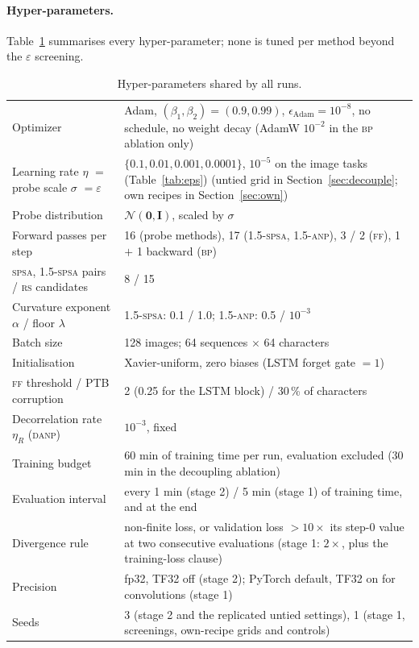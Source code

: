 \documentclass{article}
\newcommand{\method}[1]{\textsc{#1}}
\newcommand{\BP}{\method{bp}}
\newcommand{\SPSA}{\method{spsa}}
\newcommand{\SPSAb}{\method{1.5-spsa}}
\newcommand{\RS}{\method{rs}}
\newcommand{\ANPb}{\method{1.5-anp}}
\newcommand{\DANP}{\method{danp}}
\newcommand{\FF}{\method{ff}}
\newcommand{\bI}{\mathbf{I}}
\begin{document}
\paragraph{Hyper-parameters.}
Table~\ref{tab:hparams} summarises every hyper-parameter; none is tuned per method
beyond the $\varepsilon$ screening.

\begin{table}[ht]
  \caption{Hyper-parameters shared by all runs.}
  \label{tab:hparams}
  \centering
  \footnotesize
  \begin{tabular}{l p{7.9cm}}
    \toprule
    Optimizer & Adam, $(\beta_1,\beta_2)=(0.9,0.99)$, $\epsilon_{\text{Adam}}=10^{-8}$, no schedule, no weight decay (AdamW $10^{-2}$ in the \BP{} ablation only) \\
    Learning rate $\eta$ $=$ probe scale $\sigma$ $=\varepsilon$ & $\{0.1, 0.01, 0.001, 0.0001\}$, $10^{-5}$ on the image tasks (Table~\ref{tab:eps}) (untied grid in Section~\ref{sec:decouple}; own recipes in Section~\ref{sec:own}) \\
    Probe distribution & $\mathcal{N}(\mathbf{0},\bI)$, scaled by $\sigma$ \\
    Forward passes per step & 16 (probe methods), 17 (\SPSAb{}, \ANPb{}), 3 / 2 (\FF{}), 1 $+$ 1 backward (\BP{}) \\
    \SPSA{}, \SPSAb{} pairs / \RS{} candidates & 8 / 15 \\
    Curvature exponent $\alpha$ / floor $\lambda$ & \SPSAb{}: 0.1 / 1.0; \ANPb{}: 0.5 / $10^{-3}$ \\
    Batch size & 128 images; 64 sequences $\times$ 64 characters \\
    Initialisation & Xavier-uniform, zero biases (LSTM forget gate $=1$) \\
    \FF{} threshold / PTB corruption & 2 (0.25 for the LSTM block) / 30\,\% of characters \\
    Decorrelation rate $\eta_R$ (\DANP{}) & $10^{-3}$, fixed \\
    Training budget & 60 min of training time per run, evaluation excluded (30 min in the decoupling ablation) \\
    Evaluation interval & every 1 min (stage 2) / 5 min (stage 1) of training time, and at the end \\
    Divergence rule & non-finite loss, or validation loss $>10\times$ its step-0 value at two consecutive evaluations (stage 1: $2\times$, plus the training-loss clause) \\
    Precision & fp32, TF32 off (stage 2); PyTorch default, TF32 on for convolutions (stage 1) \\
    Seeds & 3 (stage 2 and the replicated untied settings), 1 (stage 1, screenings, own-recipe grids and controls) \\
    \bottomrule
  \end{tabular}
\end{table}
\end{document}
